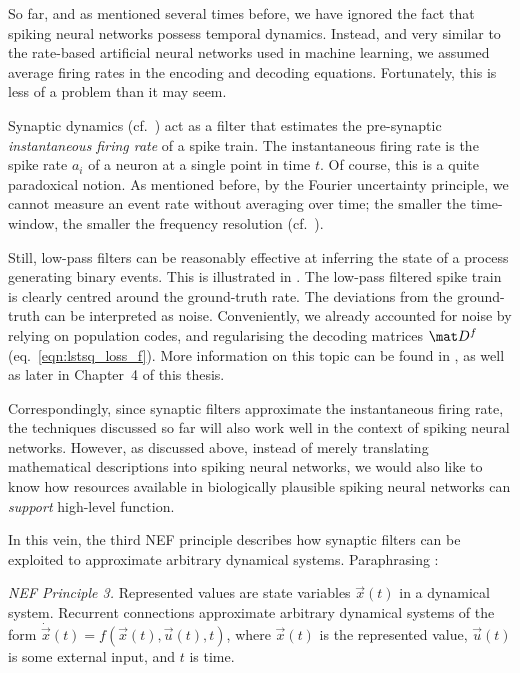 So far, and as mentioned several times before, we have ignored the fact that spiking neural networks possess temporal dynamics.
Instead, and very similar to the rate-based artificial neural networks used in machine learning, we assumed average firing rates in the encoding and decoding equations.
Fortunately, this is less of a problem than it may seem.

Synaptic dynamics (cf.~) act as a filter that estimates the pre-synaptic \emph{instantaneous firing rate} of a spike train.
The instantaneous firing rate is the spike rate $a_i$ of a neuron at a single point in time $t$.
Of course, this is a quite paradoxical notion.
As mentioned before, by the Fourier uncertainty principle, we cannot measure an event rate without averaging over time; the smaller the time-window, the smaller the frequency resolution (cf.~\cite{gabor1946theory}).

Still, low-pass filters can be reasonably effective at inferring the state of a process generating binary events.
This is illustrated in .
The low-pass filtered spike train is clearly centred around the ground-truth rate.
The deviations from the ground-truth can be interpreted as noise.
Conveniently, we already accounted for noise by relying on population codes, and regularising the decoding matrices $\mat D^f$ (eq.~\ref{eqn:lstsq_loss_f}).
More information on this topic can be found in \citet[Chapter~4]{eliasmith2003neural}, as well as later in Chapter~4 of this thesis.

Correspondingly, since synaptic filters approximate the instantaneous firing rate, the techniques discussed so far will also work well in the context of spiking neural networks.
However, as discussed above, instead of merely translating mathematical descriptions into spiking neural networks, we would also like to know how resources available in biologically plausible spiking neural networks can \emph{support} high-level function.

In this vein, the third NEF principle describes how synaptic filters can be exploited to approximate arbitrary dynamical systems.
Paraphrasing \citet{eliasmith2003neural}:
\begin{framed}
	\noindent\emph{NEF Principle 3.}
	Represented values are state variables $\vec x(t)$ in a dynamical system. Recurrent connections approximate arbitrary dynamical systems of the form $\dot{\vec x}(t) = f(\vec x(t), \vec u(t), t)$, where $\vec x(t)$ is the represented value, $\vec u(t)$ is some external input, and $t$ is time.
\end{framed}

